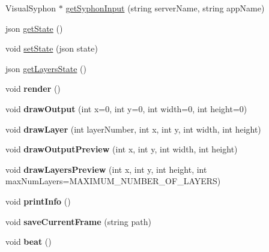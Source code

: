 \begin{DoxyCompactItemize}
\item 
Visual\+Syphon $\ast$ \hyperlink{class_engine_acd0e841800f3376e2629298d9225a72b}{get\+Syphon\+Input} (string server\+Name, string app\+Name)
\item 
json \hyperlink{class_engine_aafca00518b99bb4c493d3206d5c3bf9f}{get\+State} ()
\item 
void \hyperlink{class_engine_aa04b3d433a32a2b7baa6df9141d7a911}{set\+State} (json state)
\item 
json \hyperlink{class_engine_ae66a8b01a9d58d880b744de54e0ac431}{get\+Layers\+State} ()
\item 
\mbox{\label{class_engine_a7960743aefd62e846e7f3cd92c18bc73}} 
void {\bfseries render} ()
\item 
\mbox{\label{class_engine_a564b2faadbe929f38aa02cdd4436ece6}} 
void {\bfseries draw\+Output} (int x=0, int y=0, int width=0, int height=0)
\item 
\mbox{\label{class_engine_a565a7f269e754b894d91bf76070b4cdd}} 
void {\bfseries draw\+Layer} (int layer\+Number, int x, int y, int width, int height)
\item 
\mbox{\label{class_engine_a7f7a7d140a8bba36827d6f7086528ac5}} 
void {\bfseries draw\+Output\+Preview} (int x, int y, int width, int height)
\item 
\mbox{\label{class_engine_ab17e462ac3798478f26a96ad92125c4e}} 
void {\bfseries draw\+Layers\+Preview} (int x, int y, int height, int max\+Num\+Layers=M\+A\+X\+I\+M\+U\+M\+\_\+\+N\+U\+M\+B\+E\+R\+\_\+\+O\+F\+\_\+\+L\+A\+Y\+E\+RS)
\item 
\mbox{\label{class_engine_aaf8e3940d24161c0f997b72d589068b8}} 
void {\bfseries print\+Info} ()
\item 
\mbox{\label{class_engine_a664e672344fe4b517afd8a69032f15d0}} 
void {\bfseries save\+Current\+Frame} (string path)
\item 
\mbox{\label{class_engine_abbe2df9eae88e6533ee3359c298c0b0d}} 
void {\bfseries beat} ()
\item 
\mbox{\label{class_engine_ad34cbad27b16111b2ac1918ad94ee040}} 

\end{DoxyCompactItemize}
